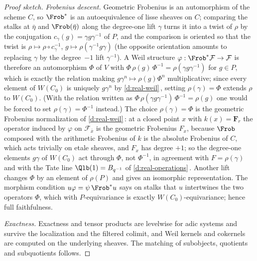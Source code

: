 \documentclass[11pt]{article}
\theoremstyle{plain}
\theoremstyle{definition}
\newcommand{\Fq}{\mathbf F_{r}}
\newcommand{\Cref}[1]{\hyperref[#1]{\ref{#1}}\,\hyperref[#1]{\nameref*{#1}}}
\begin{document}
\begin{proof}[Proof sketch]
\emph{Frobenius descent.}  Geometric Frobenius is an automorphism of the
scheme $C$, so $\Frob^*$ is an autoequivalence of lisse sheaves on $C$;
comparing the stalks at $\bar\eta$ and $\Frob(\bar\eta)$ along the
degree-one lift $\gamma$ turns it into a twist of $\rho$ by the conjugation
$c_\gamma(g)=\gamma g\gamma^{-1}$ of $P$, and the comparison is oriented
so that the twist is $\rho\mapsto\rho\circ c_\gamma^{-1}$,
$g\mapsto\rho(\gamma^{-1}g\gamma)$ (the opposite orientation amounts to
replacing $\gamma$ by the degree~$-1$ lift $\gamma^{-1}$).  A Weil
structure $\varphi:\Frob^*\mathcal F\to\mathcal F$ is therefore an
automorphism $\Phi$ of $V$ with
$\Phi\,\rho(g)\,\Phi^{-1}=\rho(\gamma g\gamma^{-1})$ for $g\in P$, which is
exactly the relation making $g\gamma^{n}\mapsto\rho(g)\Phi^{n}$
multiplicative;  since every element of $W(C_0)$ is uniquely $g\gamma^{n}$
by \Cref{d:real-weil}, setting $\rho(\gamma)=\Phi$ extends $\rho$ to
$W(C_0)$.  (With the relation written as
$\Phi\,\rho(\gamma g\gamma^{-1})\,\Phi^{-1}=\rho(g)$ one would be forced to
set $\rho(\gamma)=\Phi^{-1}$ instead.)  The choice $\rho(\gamma)=\Phi$ is
the geometric Frobenius normalization of \Cref{d:real-weil}:  at a closed
point $x$ with $k(x)=\Fq$ the operator induced by $\varphi$ on
$\mathcal F_{\bar x}$ is the geometric Frobenius $F_x$, because $\Frob$
composed with the arithmetic Frobenius of $k$ is the absolute Frobenius of
$C$, which acts trivially on etale sheaves, and $F_x$ has degree $+1$;  so
the degree-one elements $g\gamma$ of $W(C_0)$ act through $\Phi$, not
$\Phi^{-1}$, in agreement with $F=\rho(\gamma)$ and with the Tate line
$\Qlb(1)=B_{q^{-1}}$ of \Cref{d:real-operations}.  Another lift changes
$\Phi$ by an element of $\rho(P)$ and gives an isomorphic representation.  The
morphism condition $u\varphi=\psi\,\Frob^{*}u$ says on stalks that $u$
intertwines the two operators $\Phi$, which with $P$-equivariance is exactly
$W(C_0)$-equivariance;  hence full faithfulness.

\emph{Exactness.}  Exactness and tensor products are levelwise for adic
systems and survive the localization and the filtered colimit, and Weil
kernels and cokernels are computed on the underlying sheaves.  The matching
of subobjects, quotients and subquotients follows.
\end{proof}
\end{document}
